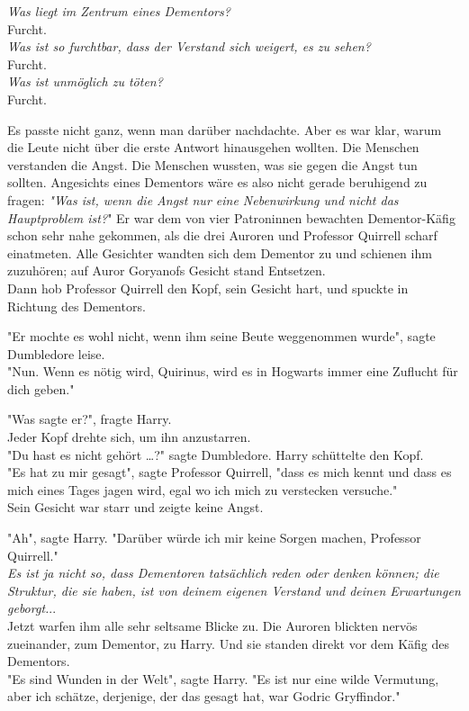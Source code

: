 {\emph{Was liegt im Zentrum eines Dementors?}\\ Furcht.\\ \emph{Was ist so furchtbar, dass der Verstand sich weigert, es zu sehen?}\\ Furcht.\\ \emph{Was ist unmöglich zu töten?}\\ Furcht.

Es passte nicht ganz, wenn man darüber nachdachte. Aber es war klar, warum die Leute nicht über die erste Antwort hinausgehen wollten. Die Menschen verstanden die Angst. Die Menschen wussten, was sie gegen die Angst tun sollten. Angesichts eines Dementors wäre es also nicht gerade beruhigend zu fragen: \emph{"Was ist, wenn die Angst nur eine Nebenwirkung und nicht das} \emph{Hauptproblem ist?}" Er war dem von vier Patroninnen bewachten Dementor-Käfig schon sehr nahe gekommen, als die drei Auroren und Professor Quirrell scharf einatmeten. Alle Gesichter wandten sich dem Dementor zu und schienen ihm zuzuhören; auf Auror Goryanofs Gesicht stand Entsetzen.\\ Dann hob Professor Quirrell den Kopf, sein Gesicht hart, und spuckte in Richtung des Dementors.

"Er mochte es wohl nicht, wenn ihm seine Beute weggenommen wurde", sagte Dumbledore leise.\\ "Nun. Wenn es nötig wird, Quirinus, wird es in Hogwarts immer eine Zuflucht für dich geben."

"Was sagte er?", fragte Harry.\\ Jeder Kopf drehte sich, um ihn anzustarren.\\ "Du hast es nicht gehört …?" sagte Dumbledore. Harry schüttelte den Kopf.\\ "Es hat zu mir gesagt", sagte Professor Quirrell, "dass es mich kennt und dass es mich eines Tages jagen wird, egal wo ich mich zu verstecken versuche."\\ Sein Gesicht war starr und zeigte keine Angst.

"Ah", sagte Harry. "Darüber würde ich mir keine Sorgen machen, Professor Quirrell."\\ \emph{Es ist ja nicht so, dass Dementoren tatsächlich reden oder denken können; die Struktur, die sie haben, ist von deinem eigenen Verstand und deinen Erwartungen geborgt.}..\\ Jetzt warfen ihm alle sehr seltsame Blicke zu. Die Auroren blickten nervös zueinander, zum Dementor, zu Harry. Und sie standen direkt vor dem Käfig des Dementors.\\ "Es sind Wunden in der Welt", sagte Harry. "Es ist nur eine wilde Vermutung, aber ich schätze, derjenige, der das gesagt hat, war Godric Gryffindor."

}
